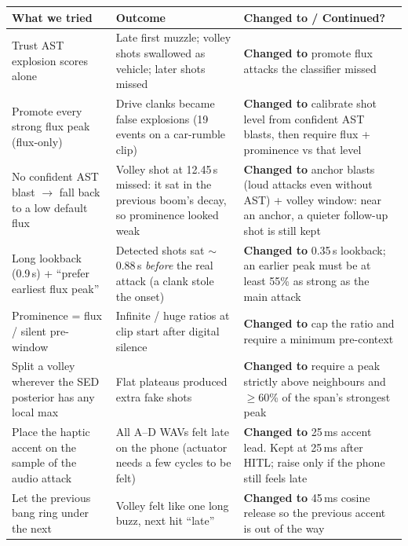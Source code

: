 \documentclass[11pt,a4paper]{article}
\begin{document}
\begin{center}
\small
\begin{tabularx}{\textwidth}{@{}>{\raggedright\arraybackslash}p{4cm}>{\raggedright\arraybackslash}p{4cm}>{\raggedright\arraybackslash}X@{}}
\toprule
\textbf{What we tried} & \textbf{Outcome} & \textbf{Changed to / Continued?} \\
\midrule
Trust AST explosion scores alone & Late first muzzle; volley shots swallowed as vehicle; later shots missed & \textbf{Changed to} promote flux attacks the classifier missed \\
\addlinespace
Promote every strong flux peak (flux-only) & Drive clanks became false explosions (19 events on a car-rumble clip) & \textbf{Changed to} calibrate shot level from confident AST blasts, then require flux + prominence vs that level \\
\addlinespace
No confident AST blast $\to$ fall back to a low default flux & Volley shot at 12.45\,s missed: it sat in the previous boom's decay, so prominence looked weak & \textbf{Changed to} anchor blasts (loud attacks even without AST) + volley window: near an anchor, a quieter follow-up shot is still kept \\
\addlinespace
Long lookback (0.9\,s) + ``prefer earliest flux peak'' & Detected shots sat $\sim$0.88\,s \emph{before} the real attack (a clank stole the onset) & \textbf{Changed to} 0.35\,s lookback; an earlier peak must be at least 55\% as strong as the main attack \\
\addlinespace
Prominence = flux / silent pre-window & Infinite / huge ratios at clip start after digital silence & \textbf{Changed to} cap the ratio and require a minimum pre-context \\
\addlinespace
Split a volley wherever the SED posterior has any local max & Flat plateaus produced extra fake shots & \textbf{Changed to} require a peak strictly above neighbours and $\ge$60\% of the span's strongest peak \\
\addlinespace
Place the haptic accent on the sample of the audio attack & All A--D WAVs felt late on the phone (actuator needs a few cycles to be felt) & \textbf{Changed to} 25\,ms accent lead. Kept at 25\,ms after HITL; raise only if the phone still feels late \\
\addlinespace
Let the previous bang ring under the next & Volley felt like one long buzz, next hit ``late'' & \textbf{Changed to} 45\,ms cosine release so the previous accent is out of the way \\
\bottomrule
\end{tabularx}
\end{center}
\end{document}
